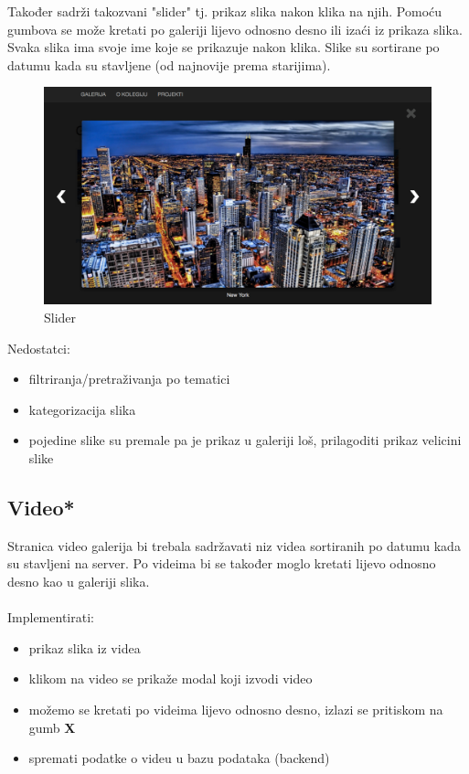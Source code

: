 \documentclass[]{article}
\begin{document}
Također sadrži takozvani "slider" tj. prikaz slika nakon klika na njih. Pomoću gumbova se može kretati po galeriji lijevo odnosno desno ili izaći iz prikaza slika. Svaka slika ima svoje ime koje se prikazuje nakon klika. Slike su sortirane po datumu kada su stavljene (od najnovije prema starijima).
\\
\begin{figure}[h]
	\centering
	\includegraphics[scale=0.23]{slider}
	\caption{Slider}
	\label{fig:mesh1}
\end{figure}

Nedostatci:
\begin{itemize}
	\item filtriranja/pretraživanja po tematici
	\item kategorizacija slika
	\item pojedine slike su premale pa je prikaz u galeriji loš, prilagoditi prikaz velicini slike
\end{itemize}
\newpage
\subsection{Video*}
Stranica video galerija bi trebala sadržavati niz videa sortiranih po datumu kada su stavljeni na server. Po videima bi se također moglo kretati lijevo odnosno desno kao u galeriji slika.
\\
\\
Implementirati:
\begin{itemize}
	\item prikaz slika iz videa
	\item klikom na video se prikaže modal koji izvodi video
	\item možemo se kretati po videima lijevo odnosno desno, izlazi se pritiskom na gumb \textbf{X}
	\item spremati podatke o videu u bazu podataka (backend)
\end{itemize}
\end{document}
